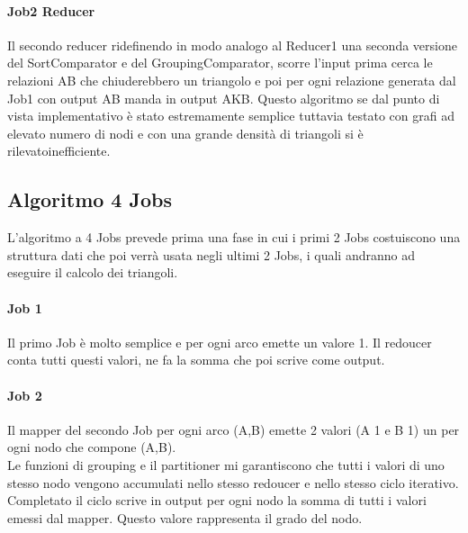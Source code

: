 \documentclass[paper=a4, fontsize=11pt]{scrartcl}	%
\numberwithin{equation}{section}															%
\numberwithin{figure}{section}																%
\numberwithin{table}{section}																%
\begin{document}
\paragraph{Job2 Reducer}
Il secondo reducer ridefinendo in modo analogo al Reducer1 una seconda versione del SortComparator e del GroupingComparator, scorre l'input prima cerca le relazioni AB che chiuderebbero un triangolo e poi per ogni relazione generata dal Job1 con output AB manda in output AKB.
Questo algoritmo se dal punto di vista implementativo è stato estremamente semplice tuttavia testato con grafi ad elevato numero di nodi e con una grande densità di triangoli  si è rilevatoinefficiente.



\subsection{Algoritmo 4 Jobs}
L'algoritmo a 4 Jobs prevede prima una fase in cui i primi 2 Jobs costuiscono una struttura dati che poi verrà usata negli ultimi 2 Jobs, i quali andranno ad eseguire il calcolo dei triangoli.
\paragraph{Job 1}
Il primo Job è molto semplice e per ogni arco emette un valore 1. Il redoucer conta tutti questi valori, ne fa la somma che poi scrive come output.
\paragraph{Job 2}
Il mapper del secondo Job per ogni arco (A,B) emette 2 valori (A 1 e B 1) un per ogni nodo che compone (A,B).\\
Le funzioni di grouping e il partitioner mi garantiscono che tutti i valori di uno stesso nodo vengono accumulati nello stesso redoucer e nello stesso ciclo iterativo. Completato il ciclo scrive in output per ogni nodo la somma di tutti i valori emessi dal mapper. Questo valore rappresenta il grado del nodo.
\end{document}

